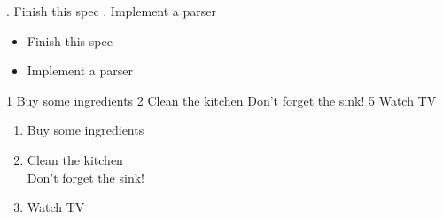 \begin{examples}
\begin{examplesource}
. Finish this spec
. Implement a parser
\end{examplesource}
  \begin{exampleoutput}
    \begin{minipage}{0.5\textwidth}
      \begin{itemize}[noitemsep]
      \item Finish this spec
      \item Implement a parser
      \end{itemize}
    \end{minipage}
  \end{exampleoutput}
\begin{examplesource}
1 Buy some ingredients
2 Clean the kitchen
  Don't forget the sink!
5 Watch TV
\end{examplesource}
  \begin{exampleoutput}
    \begin{minipage}{0.5\textwidth}
      \begin{enumerate}[noitemsep]
      \item Buy some ingredients
      \item Clean the kitchen\\Don't forget the sink!
        \setcounter{enumi}{4}
      \item Watch TV
      \end{enumerate}
    \end{minipage}
  \end{exampleoutput}
\end{examples}

